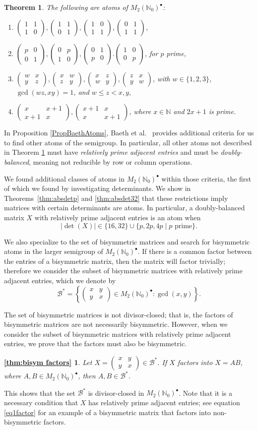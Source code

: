 \documentclass{amsart}
\newcommand{\pmx}[4]{\begin{pmatrix} #1 & #2 \\ #3 & #4 \end{pmatrix}}
\newcommand{\mtwo}{M_2(\mathbb{N}_0)^\bullet}
\newcommand{\B}{\mathcal{B}}
\newcommand{\Bstar}{\mathcal{B}^*}
\newcommand{\absdet}[1]{\left|\det\left( #1 \right)\right|}
\newtheorem{theorem}{Theorem}[section]
\begin{document}
\begin{theorem}\label{TheoremBaethAtoms}
\cite[Theorem 4.6, Prop. 4.8]{Baeth21}
The following are atoms of $\mtwo$:
    \begin{enumerate}
        \item $\pmx{1}{1}{1}{0}, \pmx{1}{1}{0}{1}, \pmx{1}{0}{1}{1}, \pmx{0}{1}{1}{1}$,
        \item $\pmx{p}{0}{0}{1}, \pmx{0}{p}{1}{0}, \pmx{0}{1}{p}{0}. \pmx{1}{0}{0}{p}$, for $p$ prime,
        \item $\pmx{w}{x}{y}{z}, \pmx{x}{w}{z}{y}, \pmx{x}{z}{w}{y}, \pmx{z}{x}{y}{w}$, with $w \in \{1,2,3\}$, $\gcd{(wz, xy)}=1$, and $w\leq z<x,y$,
        \item $\pmx{x}{x+1}{x+1}{x},\pmx{x+1}{x}{x}{x+1}$, where $x\in \mathbb{N}$ and $2x+1$  is prime.
    \end{enumerate}
\end{theorem}

In Proposition \ref{PropBaethAtoms}, Baeth et al.~\cite{Baeth21} provides additional criteria for us to find other atoms of the semigroup. In particular, all other atoms not described in Theorem \ref{TheoremBaethAtoms} must have {\it relatively prime adjacent entries} and must be {\it doubly-balanced}, meaning not reducible by row or column operations. 

We found additional classes of atoms in $\mtwo$ within those criteria, the first of which we found by investigating determinants. We show in Theorems~\ref{thm:absdetp} and \ref{thm:absdet32} that these restrictions imply matrices with certain determinants are atoms. In particular, a doubly-balanced matrix $X$ with relatively prime adjacent entries is an atom when $$\absdet{X}\in \{16,32\}\cup \{p,2p,4p \mid p \text{ prime}\}.$$

We also specialize to the set of bisymmetric matrices and search for bisymmetric atoms in the larger semigroup of $\mtwo$. If there is a common factor between the entries of a bisymmetric matrix, then the matrix will factor trivially; therefore we consider the subset of bisymmetric matrices with relatively prime adjacent entries, which we denote by
\[\B^*=\left\{\pmx{x}{y}{y}{x}\in \mtwo:\gcd(x,y)\right\}.\]

The set of bisymmetric matrices is not divisor-closed; that is, the factors of bisymmetric matrices are not necessarily bisymmetric. However, when we consider the subset of bisymmetric matrices with relatively prime adjacent entries, we prove that the factors must also be bisymmetric.
\newtheorem*{thm51}{\cref{thm:bisym factors}}
\begin{thm51} Let $X=\pmx{x}{y}{y}{x}\in \Bstar$. If $X$ factors into $X=AB$, where $A,B \in \mtwo$, then $A,B \in \Bstar$. 
\end{thm51}
\noindent This shows that the set $\B^*$ is divisor-closed in $\mtwo$. Note that it is a necessary condition that $X$ has relatively prime adjacent entries; see equation \eqref{eq1factor} for an example of a bisymmetric matrix that factors into non-bisymmetric factors.
\end{document}
